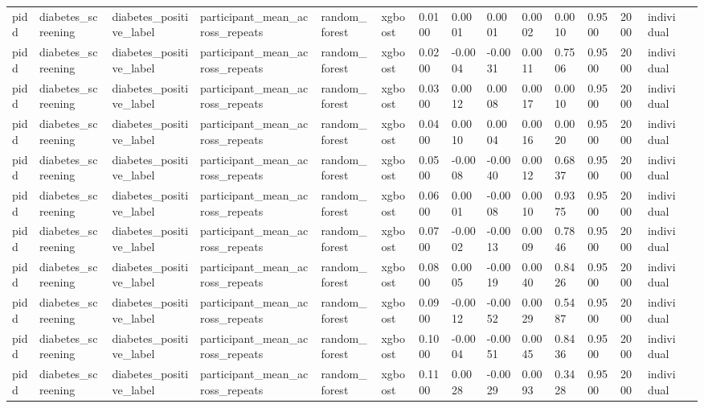 \begin{tabular}{lllllllllllllll}
pidd & diabetes\_screening & diabetes\_positive\_label & participant\_mean\_across\_repeats & random\_forest & xgboost & 0.0100 & 0.0001 & 0.0001 & 0.0002 & 0.0010 & 0.9500 & 2000 & individual &  \\
pidd & diabetes\_screening & diabetes\_positive\_label & participant\_mean\_across\_repeats & random\_forest & xgboost & 0.0200 & -0.0004 & -0.0031 & 0.0011 & 0.7506 & 0.9500 & 2000 & individual &  \\
pidd & diabetes\_screening & diabetes\_positive\_label & participant\_mean\_across\_repeats & random\_forest & xgboost & 0.0300 & 0.0012 & 0.0008 & 0.0017 & 0.0010 & 0.9500 & 2000 & individual &  \\
pidd & diabetes\_screening & diabetes\_positive\_label & participant\_mean\_across\_repeats & random\_forest & xgboost & 0.0400 & 0.0010 & 0.0004 & 0.0016 & 0.0020 & 0.9500 & 2000 & individual &  \\
pidd & diabetes\_screening & diabetes\_positive\_label & participant\_mean\_across\_repeats & random\_forest & xgboost & 0.0500 & -0.0008 & -0.0040 & 0.0012 & 0.6837 & 0.9500 & 2000 & individual &  \\
pidd & diabetes\_screening & diabetes\_positive\_label & participant\_mean\_across\_repeats & random\_forest & xgboost & 0.0600 & 0.0001 & -0.0008 & 0.0010 & 0.9375 & 0.9500 & 2000 & individual &  \\
pidd & diabetes\_screening & diabetes\_positive\_label & participant\_mean\_across\_repeats & random\_forest & xgboost & 0.0700 & -0.0002 & -0.0013 & 0.0009 & 0.7846 & 0.9500 & 2000 & individual &  \\
pidd & diabetes\_screening & diabetes\_positive\_label & participant\_mean\_across\_repeats & random\_forest & xgboost & 0.0800 & 0.0005 & -0.0019 & 0.0040 & 0.8426 & 0.9500 & 2000 & individual &  \\
pidd & diabetes\_screening & diabetes\_positive\_label & participant\_mean\_across\_repeats & random\_forest & xgboost & 0.0900 & -0.0012 & -0.0052 & 0.0029 & 0.5487 & 0.9500 & 2000 & individual &  \\
pidd & diabetes\_screening & diabetes\_positive\_label & participant\_mean\_across\_repeats & random\_forest & xgboost & 0.1000 & -0.0004 & -0.0051 & 0.0045 & 0.8436 & 0.9500 & 2000 & individual &  \\
pidd & diabetes\_screening & diabetes\_positive\_label & participant\_mean\_across\_repeats & random\_forest & xgboost & 0.1100 & 0.0028 & -0.0029 & 0.0093 & 0.3428 & 0.9500 & 2000 & individual &  \\

\end{tabular}

